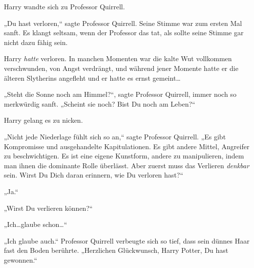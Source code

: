 Harry wandte sich zu Professor Quirrell.

„Du hast verloren,“ sagte Professor Quirrell. Seine Stimme war zum ersten Mal sanft. Es klangt seltsam, wenn der Professor das tat, als sollte seine Stimme gar nicht dazu fähig sein.

Harry \emph{hatte} verloren. In manchen Momenten war die kalte Wut vollkommen verschwunden, von Angst verdrängt, und während jener Momente hatte er die älteren Slytherins angefleht und er hatte es ernst gemeint…

„Steht die Sonne noch am Himmel?“, sagte Professor Quirrell, immer noch so merkwürdig sanft. „Scheint sie noch? Bist Du noch am Leben?“

Harry gelang es zu nicken.

„Nicht jede Niederlage fühlt sich so an,“ sagte Professor Quirrell. „Es gibt Kompromisse und ausgehandelte Kapitulationen. Es gibt andere Mittel, Angreifer zu beschwichtigen. Es ist eine eigene Kunstform, andere zu manipulieren, indem man ihnen die dominante Rolle überlässt. Aber zuerst muss das Verlieren \emph{denkbar} sein. Wirst Du Dich daran erinnern, wie Du verloren hast?“

„Ja.“

„Wirst Du verlieren können?“

„Ich…glaube schon…“

„Ich glaube auch.“ Professor Quirrell verbeugte sich so tief, dass sein dünnes Haar fast den Boden berührte. „Herzlichen Glückwunsch, Harry Potter, Du hast gewonnen.“

